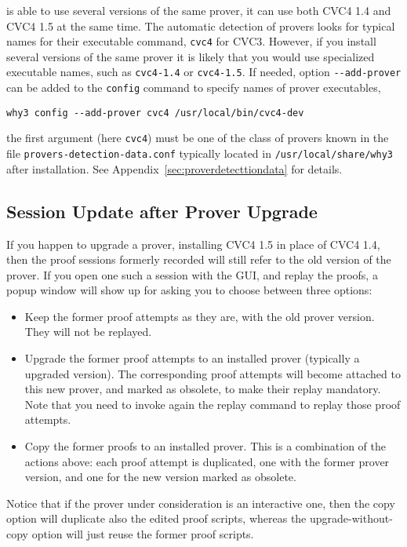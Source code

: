 \why is able to use several versions of the same
prover, \eg it can use both CVC4 1.4 and CVC4 1.5 at the same time.
The automatic detection of provers looks for typical names for their
executable command, \eg \texttt{cvc4} for CVC3. However, if you
install several versions of the same prover it is likely that you would
use specialized executable names, such as \texttt{cvc4-1.4} or
\texttt{cvc4-1.5}. If needed, option \verb|--add-prover| can be
added to the \texttt{config} command to specify names of prover executables, \eg
{}
\begin{verbatim}
why3 config --add-prover cvc4 /usr/local/bin/cvc4-dev
\end{verbatim}
the first argument (here \verb|cvc4|) must be one of the class of
provers known in the file \verb|provers-detection-data.conf| typically
located in \verb|/usr/local/share/why3| after installation. See
Appendix~\ref{sec:proverdetecttiondata} for details.


\subsection{Session Update after Prover Upgrade}
\label{sec:uninstalledprovers}

If you happen to upgrade a prover, \eg installing CVC4 1.5 in place
of CVC4 1.4, then the proof sessions formerly recorded will still
refer to the old version of the prover. If you open one such a session
with the GUI, and replay the proofs, a popup window will show up for asking you to choose
between three options:
\begin{itemize}
\item Keep the former proof attempts as they are, with the old prover version. They will not be replayed.
\item Upgrade the former proof attempts to an installed prover (typically a
  upgraded version). The corresponding proof attempts will become
  attached to this new prover, and marked as obsolete,
  to make their replay mandatory. Note that you need to invoke again the replay command to replay those proof attempts.
\item Copy the former proofs to an installed prover. This is a
  combination of the actions above: each proof attempt is duplicated,
  one with the former prover version, and one for the new
  version marked as obsolete.
\end{itemize}

Notice that if the prover under consideration is an interactive one, then
the copy option will duplicate also the edited proof scripts, whereas
the upgrade-without-copy option will just reuse the former proof scripts.

